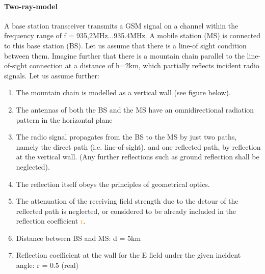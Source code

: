 \paragraph{Two-ray-model}
A base station transceiver transmits a GSM signal on a channel within the frequency range of f = 935,2MHz...935.4MHz. A mobile station (MS) is connected to this base station (BS). Let us assume that there is a line-of sight condition between them. Imagine further that there is a mountain chain parallel to the line-of-sight connection at a distance of h=2km, which partially reflects incident radio signals.
Let us assume further:
\begin{enumerate}
    \item The mountain chain is modelled as a vertical wall (see figure below).
    \item The antennas of both the BS and the MS have an omnidirectional radiation pattern in the horizontal plane
    \item The radio signal propagates from the BS to the MS by just two paths, namely the direct path (i.e. line-of-sight), and one reflected path, by reflection at the vertical wall. (Any further reflections such as ground reflection shall be neglected).
    \item The reflection itself obeys the principles of geometrical optics.
    \item The attenuation of the receiving field strength due to the detour of the reflected path is neglected, or considered to be already included in the reflection coefficient \textcolor{orange}{r}.
    \item Distance between BS and MS: d = 5km
    \item Reflection coefficient at the wall for the E field under the given incident angle: r = 0.5 (real)
\end{enumerate}

